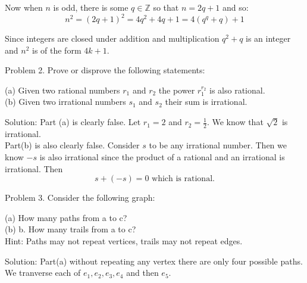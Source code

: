 \documentclass[16 pt]{amsart}
\theoremstyle{definition}
\theoremstyle{remark}
\numberwithin{equation}{subsection}
\newcommand{\Z}{\mathbb{Z}}
\begin{document}
Now when $n$ is odd, there is some $q\in\Z$ so that $n=2q+1$ and so:
\[
n^2 = (2q+1)^2 = 4q^2+4q+1 = 4(q^q+q)+1
\]

Since integers are closed under addition and multiplication $q^2+q$ is an integer and $n^2$ is of the form $4k+1$.

\newpage

Problem 2. Prove or disprove the following statements:

(a) Given two rational numbers $r_1$ and $r_2$ the power $r_1^{r_2}$ is also rational.\\

(b) Given two irrational numbers $s_1$ and $s_2$ their sum is irrational.

\vspace{1in}

Solution: Part (a) is clearly false.  Let $r_1=2$ and $r_2 = \frac{1}{2}$.  We know that $\sqrt{2}$ is irrational.\\

Part(b) is also clearly false.  Consider $s$ to be any irrational number.  Then we know $-s$ is also irrational since the product of a rational and an irrational is irrational.  Then
\[
s+ (-s) = 0 \text{ which is rational.}
\]

\newpage

Problem 3. Consider the following graph:



(a) How many paths from a to c?\\

(b) b. How many trails from a to c?\\

Hint: Paths may not repeat vertices, trails may not repeat edges. 

\vspace{1in}

Solution: Part(a) without repeating any vertex there are only four possible paths.  We tranverse each of $e_1,e_2,e_3,e_4$ and then $e_5$.\\
\end{document}
